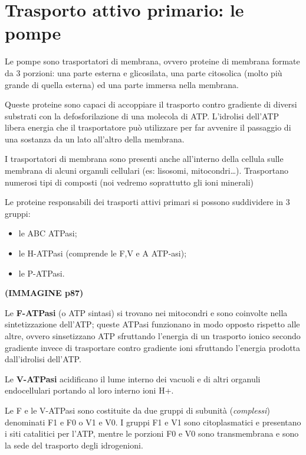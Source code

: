 \documentclass[]{article}
\begin{document}
\section{Trasporto attivo primario: le
pompe}\label{trasporto-attivo-primario-le-pompe}

Le pompe sono trasportatori di membrana, ovvero proteine di membrana
formate da 3 porzioni: una parte esterna e glicosilata, una parte
citosolica (molto più grande di quella esterna) ed una parte immersa
nella membrana.

Queste proteine sono capaci di accoppiare il trasporto contro gradiente
di diversi substrati con la defosforilazione di una molecola di ATP.
L'idrolisi dell'ATP libera energia che il trasportatore può utilizzare
per far avvenire il passaggio di una sostanza da un lato all'altro della
membrana.

I trasportatori di membrana sono presenti anche all'interno della
cellula sulle membrana di alcuni organuli cellulari (es: lisosomi,
mitocondri\ldots{}). Trasportano numerosi tipi di composti (noi vedremo
soprattutto gli ioni minerali)

Le proteine responsabili dei trasporti attivi primari si possono
suddividere in 3 gruppi:

\begin{itemize}
\itemsep1pt\parskip0pt
\item
  le ABC ATPasi;
\item
  le H-ATPasi (comprende le F,V e A ATP-asi);
\item
  le P-ATPasi.
\end{itemize}

\textbf{(IMMAGINE p87)}

Le \textbf{F-ATPasi} (o ATP sintasi) si trovano nei mitocondri e sono
coinvolte nella sintetizzazione dell'ATP; queste ATPasi funzionano in
modo opposto rispetto alle altre, ovvero sinsetizzano ATP sfruttando
l'energia di un trasporto ionico secondo gradiente invece di trasportare
contro gradiente ioni sfruttando l'energia prodotta dall'idrolisi
dell'ATP.

Le \textbf{V-ATPasi} acidificano il lume interno dei vacuoli e di altri
organuli endocellulari portando al loro interno ioni H+.

Le F e le V-ATPasi sono costituite da due gruppi di subunità
(\emph{complessi}) denominati F1 e F0 o V1 e V0. I gruppi F1 e V1 sono
citoplasmatici e presentano i siti catalitici per l'ATP, mentre le
porzioni F0 e V0 sono transmembrana e sono la sede del trasporto degli
idrogenioni.
\end{document}
